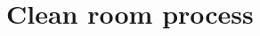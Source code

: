 \appendix
\renewcommand{\thechapter}{A}
\renewcommand{\chaptername}{Appendix A}

\chapter{Clean room process}

\label{chapA}
